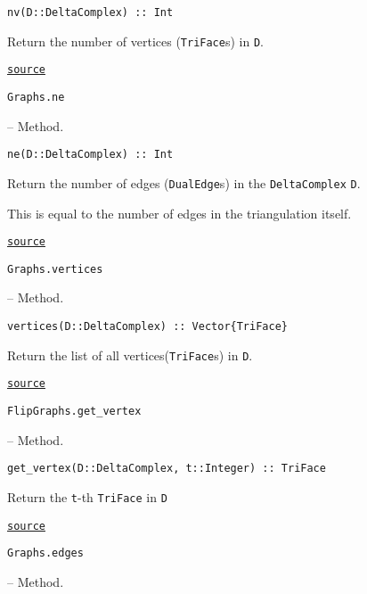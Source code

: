 \begin{adjustwidth}{2em}{0pt}


\begin{verbatim}
nv(D::DeltaComplex) :: Int
\end{verbatim}

Return the number of vertices (\texttt{TriFace}s) in \texttt{D}.



\href{https://github.com/schto223/FlipGraphs.jl/blob/490c01a7adf74b42f27dda05099165c47ae8133e/src/deltaComplex.jl#L351-L355}{\texttt{source}}


\end{adjustwidth}
\hypertarget{16904350056714108716}{\texttt{Graphs.ne}}  -- {Method.}

\begin{adjustwidth}{2em}{0pt}


\begin{verbatim}
ne(D::DeltaComplex) :: Int
\end{verbatim}

Return the number of edges (\texttt{DualEdge}s) in the \texttt{DeltaComplex} \texttt{D}.

This is equal to the number of edges in the triangulation itself.



\href{https://github.com/schto223/FlipGraphs.jl/blob/490c01a7adf74b42f27dda05099165c47ae8133e/src/deltaComplex.jl#L358-L364}{\texttt{source}}


\end{adjustwidth}
\hypertarget{17625980901339751316}{\texttt{Graphs.vertices}}  -- {Method.}

\begin{adjustwidth}{2em}{0pt}


\begin{verbatim}
vertices(D::DeltaComplex) :: Vector{TriFace}
\end{verbatim}

Return the list of all vertices(\texttt{TriFace}s) in \texttt{D}.



\href{https://github.com/schto223/FlipGraphs.jl/blob/490c01a7adf74b42f27dda05099165c47ae8133e/src/deltaComplex.jl#L292-L296}{\texttt{source}}


\end{adjustwidth}
\hypertarget{9599335666183177786}{\texttt{FlipGraphs.get\_vertex}}  -- {Method.}

\begin{adjustwidth}{2em}{0pt}


\begin{verbatim}
get_vertex(D::DeltaComplex, t::Integer) :: TriFace
\end{verbatim}

Return the \texttt{t}-th \texttt{TriFace} in \texttt{D}



\href{https://github.com/schto223/FlipGraphs.jl/blob/490c01a7adf74b42f27dda05099165c47ae8133e/src/deltaComplex.jl#L285-L289}{\texttt{source}}


\end{adjustwidth}
\hypertarget{891918059960523943}{\texttt{Graphs.edges}}  -- {Method.}

